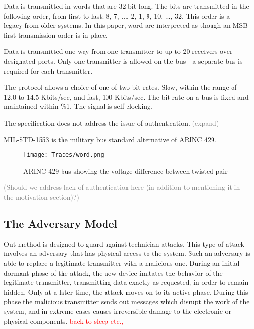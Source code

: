 \documentclass[conference]{IEEEtran}
\begin{document}
  Data is transmitted in words that are 32-bit long. The bits are transmitted in the following order, from first to last: 8, 7, ..., 2, 1, 9, 10, ..., 32. This order is a legacy from older systems. In this paper, word are interpreted as though an MSB first transmission order is in place.
  
  Data is transmitted one-way from one transmitter to up to 20 receivers over designated ports. Only one transmitter is allowed on the bus - a separate bus is required for each transmitter.  
   
  The protocol allows a choice of one of two bit rates. Slow, within the range of 12.0 to 14.5 Kbits/sec, and fast, 100 Kbits/sec. The bit rate on a bus is fixed and maintained within \%1. The signal is self-clocking.
  
  The specification does not address the issue of authentication. \textcolor{gray}{(expand)}
   
  MIL-STD-1553 \cite{} is the military bus standard alternative of ARINC 429.
  
  \begin{figure}[t]
    \centering
    \texttt{[image: Traces/word.png]}
    \caption{ARINC 429 bus showing the voltage difference between twisted pair}
    \label{fig:word_example}
  \end{figure}
  
  \textcolor{gray}{(Should we address lack of authentication here (in addition to mentioning it in the motivation section)?)}

\subsection{The Adversary Model}
  Out method is designed to guard against technician attacks. This type of attack involves an adversary that has physical access to the system. Such an adversary is able to replace a legitimate transmitter with a malicious one. During an initial dormant phase of the attack, the new device imitates the behavior of the legitimate transmitter, transmitting data exactly as requested, in order to remain hidden. Only at a later time, the attack moves on to its active phase. During this phase the malicious transmitter sends out messages which disrupt the work of the system, and in extreme cases causes irreversible damage to the electronic or physical components. \textcolor{red}{back to sleep etc.,}
  
\end{document}
